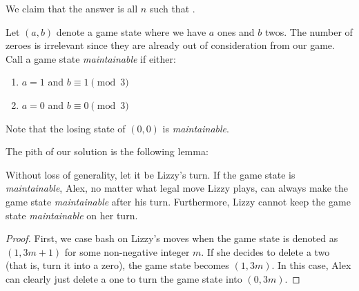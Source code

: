 \documentclass[10pt]{../usamts}
\begin{document}
\begin{solution}
We claim that the answer is all $n$ such that .

Let $(a,b)$ denote a game state where we have $a$ ones and $b$ twos. The number of zeroes is irrelevant since they are already out of consideration from our game.
Call a game state \textit{maintainable} if either:
\begin{enumerate}
    \item $a = 1$ and $b \equiv 1 \pmod 3$
    \item $a = 0$ and $b \equiv 0 \pmod 3$
\end{enumerate}
Note that the losing state of $(0,0)$ is \textit{maintainable}.

The pith of our solution is the following lemma:
\begin{claim}
    Without loss of generality, let it be Lizzy's turn. If the game state is \textit{maintainable}, Alex, no matter what legal move Lizzy plays, can always make the game state \textit{maintainable} after his turn. Furthermore, Lizzy cannot keep the game state \textit{maintainable} on her turn.
\end{claim}
\begin{proof}
    First, we case bash on Lizzy's moves when the game state is denoted as $(1, 3m+1)$ for some non-negative integer $m$.
    If she decides to delete a two (that is, turn it into a zero), the game state becomes $(1, 3m)$. In this case, Alex can clearly just delete a one to turn the game state into $(0,3m)$.


\end{proof}
\end{solution}
\end{document}
